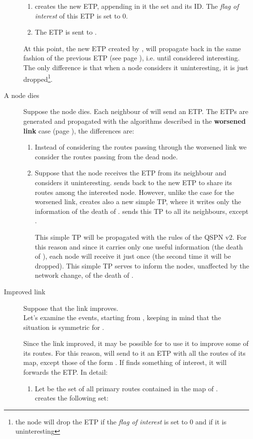 \documentclass[a4paper]{article}
\begin{document}
\begin{description}
\begin{enumerate}
		\item  creates the new ETP, appending in it the set  and
			its ID. The \emph{flag of interest} of this ETP is set
			to 0.
		\item The ETP is sent to .
	\end{enumerate}
	At this point, the new ETP created by , will propagate back in the
	same fashion of the previous ETP (see page \pageref{ETPrule1}), i.e.
	until considered interesting. The only difference is that when a node
	considers it uninteresting, it is just dropped\footnote{the node will
	drop the ETP if the \emph{flag of interest} is set to 0 and if it is
	uninteresting}.
	\item[A node dies]
		Suppose the node  dies. Each neighbour  of  will send
		an ETP. The ETPs are generated and propagated with the
		algorithms described in the \textbf{worsened link} case (page
		\pageref{wlink}), the differences are:
		\begin{enumerate}
			\item Instead of considering the routes passing
				through the worsened link we consider the
				routes passing from the dead node.
			\item Suppose that the node  receives the ETP from
				its neighbour  and considers it uninteresting.
				 sends back to  the new ETP to share its
				routes
				among the interested node. However, unlike the
				case for the worsened link,  creates also a
				new simple TP, where it writes only the
				information of the death of .
				 sends this TP to all its neighbours, except .

				This simple TP will be propagated with the
				rules of the QSPN v2. For this reason and since it carries
				only one useful information (the death of
				), each node will receive it just once (the
				second time it will be dropped). This simple
				TP serves to inform the nodes, unaffected
				by the network change, of the death of .
		\end{enumerate}
	\item[Improved link]
	\label{ilink}
		Suppose that the link  improves.\\
		Let's examine the events, starting from , keeping in mind
		that the situation is symmetric for .

		Since the link  improved, it may be possible for  to use
		it to improve some of its routes. For this reason,  will
		send to it an ETP with all the routes of its map, except those of the form
		. If  finds
		something of interest, it will forwards the ETP. In detail:
		\begin{enumerate}
			\item Let  be the set of all primary routes
				contained in the map of .\\
			       creates the following set:
			      

\end{enumerate}
\end{description}
\end{document}
